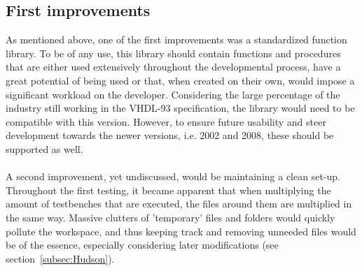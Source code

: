 \documentclass[11pt,british]{article}
\begin{document}
\subsection{First improvements}
As mentioned above, one of the first improvements was a standardized function library. To be of any use, this library should contain functions and procedures that are either used extensively throughout the developmental process, have a great potential of being used or that, when created on their own, would impose a significant workload on the developer. Considering the large percentage of the industry still working in the VHDL-93 specification, the library would need to be compatible with this version. However, to ensure future usability and steer development towards the newer versions, i.e. 2002 and 2008, these should be supported as well.\\
\\
A second improvement, yet undiscussed, would be maintaining a clean set-up. Throughout the first testing, it became apparent that when multiplying the amount of testbenches that are executed, the files around them are multiplied in the same way. Massive clutters of 'temporary' files and folders would quickly pollute the workspace, and thus keeping track and removing unneeded files would be of the essence, especially considering later modifications (see section~\ref{subsec:Hudson}).
\end{document}
